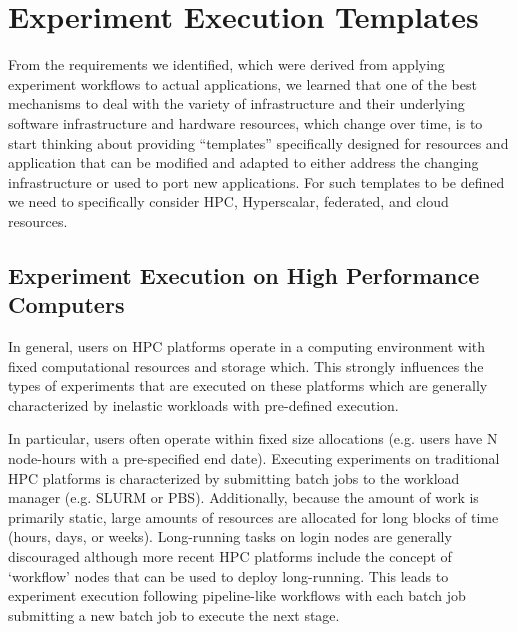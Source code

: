 \documentclass[utf8]{FrontiersinVancouver} %
\begin{document}
\section{Experiment Execution Templates}
\label{sec:templates}

From the requirements we identified, which were derived from applying experiment workflows to actual applications, we learned that one of the best mechanisms to deal with the variety of infrastructure and their underlying software infrastructure and hardware resources, which change over time, is to start thinking about providing ``templates'' specifically designed for resources and application that can be modified and adapted to either address the changing infrastructure or used to port new applications. For such templates to be defined we need to specifically consider HPC, Hyperscalar, federated, and cloud resources.

\subsection{Experiment Execution on High Performance Computers}

In general, users on HPC platforms operate in a computing environment with fixed computational resources and storage which. This strongly influences the types of experiments that are executed on these platforms which are generally characterized by inelastic workloads with pre-defined execution.

In particular, users often operate within fixed size allocations (e.g. users have N node-hours with a pre-specified end date). Executing experiments on traditional HPC platforms is characterized by submitting batch jobs to the workload manager (e.g. SLURM or PBS). Additionally, because the amount of work is primarily static, large amounts of resources are allocated for long blocks of time (hours, days, or weeks). Long-running tasks on login nodes are generally discouraged although more recent HPC platforms include the concept of `workflow' nodes that can be used to deploy long-running. This leads to experiment execution following pipeline-like workflows with each batch job submitting a new batch job to execute the next stage.
\end{document}
